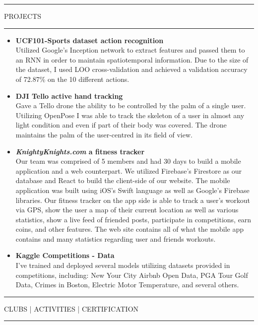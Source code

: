\documentclass{article}
\newcommand{\makesection}[1]{\hrule\vskip1mm\uppercase{#1}\vskip1mm\hrule}
\begin{document}
\makesection{Projects}
\begin{itemize}[leftmargin=.35cm]
    \item \textbf{UCF101-Sports dataset action recognition} \\
    Utilized Google's Inception network to extract features and passed them to an RNN in order to maintain spatiotemporal information. Due to the size of the dataset, I used LOO cross-validation and achieved a validation accuracy of 72.87\% on the 10 different actions.
    \item \textbf{DJI Tello active hand tracking} \\
    Gave a Tello drone the ability to be controlled by the palm of a single user. Utilizing OpenPose I was able to track the skeleton of a user in almost any light condition and even if part of their body was covered. The drone maintains the palm of the user-centred in its field of view.
    \item \textbf{\textit{KnightyKnights.com} a fitness tracker} \\
    Our team was comprised of 5 members and had 30 days to build a mobile application and a web counterpart. We utilized Firebase's Firestore as our database and React to build the client-side of our website. The mobile application was built using iOS's Swift language as well as Google's Firebase libraries. Our fitness tracker on the app side is able to track a user's workout via GPS, show the user a map of their current location as well as various statistics, show a live feed of friended posts, participate in competitions, earn coins, and other features. The web site contains all of what the mobile app contains and many statistics regarding user and friends workouts.
    \item \textbf{Kaggle Competitions - Data} \\
    I've trained and deployed several models utilizing datasets provided in competitions, including: New Your City Airbnb Open Data, PGA Tour Golf Data, Crimes in Boston, Electric Motor Temperature, and several others.
\end{itemize}
\makesection{Clubs | Activities | Certification}
\end{document}
